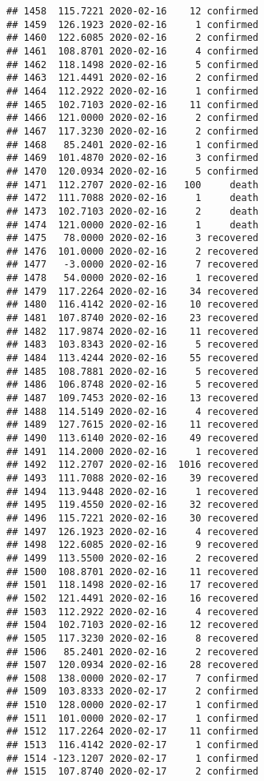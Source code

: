 \documentclass[
]{article}
\begin{document}
\begin{verbatim}
## 1458  115.7221 2020-02-16    12 confirmed
## 1459  126.1923 2020-02-16     1 confirmed
## 1460  122.6085 2020-02-16     2 confirmed
## 1461  108.8701 2020-02-16     4 confirmed
## 1462  118.1498 2020-02-16     5 confirmed
## 1463  121.4491 2020-02-16     2 confirmed
## 1464  112.2922 2020-02-16     1 confirmed
## 1465  102.7103 2020-02-16    11 confirmed
## 1466  121.0000 2020-02-16     2 confirmed
## 1467  117.3230 2020-02-16     2 confirmed
## 1468   85.2401 2020-02-16     1 confirmed
## 1469  101.4870 2020-02-16     3 confirmed
## 1470  120.0934 2020-02-16     5 confirmed
## 1471  112.2707 2020-02-16   100     death
## 1472  111.7088 2020-02-16     1     death
## 1473  102.7103 2020-02-16     2     death
## 1474  121.0000 2020-02-16     1     death
## 1475   78.0000 2020-02-16     3 recovered
## 1476  101.0000 2020-02-16     2 recovered
## 1477   -3.0000 2020-02-16     7 recovered
## 1478   54.0000 2020-02-16     1 recovered
## 1479  117.2264 2020-02-16    34 recovered
## 1480  116.4142 2020-02-16    10 recovered
## 1481  107.8740 2020-02-16    23 recovered
## 1482  117.9874 2020-02-16    11 recovered
## 1483  103.8343 2020-02-16     5 recovered
## 1484  113.4244 2020-02-16    55 recovered
## 1485  108.7881 2020-02-16     5 recovered
## 1486  106.8748 2020-02-16     5 recovered
## 1487  109.7453 2020-02-16    13 recovered
## 1488  114.5149 2020-02-16     4 recovered
## 1489  127.7615 2020-02-16    11 recovered
## 1490  113.6140 2020-02-16    49 recovered
## 1491  114.2000 2020-02-16     1 recovered
## 1492  112.2707 2020-02-16  1016 recovered
## 1493  111.7088 2020-02-16    39 recovered
## 1494  113.9448 2020-02-16     1 recovered
## 1495  119.4550 2020-02-16    32 recovered
## 1496  115.7221 2020-02-16    30 recovered
## 1497  126.1923 2020-02-16     4 recovered
## 1498  122.6085 2020-02-16     9 recovered
## 1499  113.5500 2020-02-16     2 recovered
## 1500  108.8701 2020-02-16    11 recovered
## 1501  118.1498 2020-02-16    17 recovered
## 1502  121.4491 2020-02-16    16 recovered
## 1503  112.2922 2020-02-16     4 recovered
## 1504  102.7103 2020-02-16    12 recovered
## 1505  117.3230 2020-02-16     8 recovered
## 1506   85.2401 2020-02-16     2 recovered
## 1507  120.0934 2020-02-16    28 recovered
## 1508  138.0000 2020-02-17     7 confirmed
## 1509  103.8333 2020-02-17     2 confirmed
## 1510  128.0000 2020-02-17     1 confirmed
## 1511  101.0000 2020-02-17     1 confirmed
## 1512  117.2264 2020-02-17    11 confirmed
## 1513  116.4142 2020-02-17     1 confirmed
## 1514 -123.1207 2020-02-17     1 confirmed
## 1515  107.8740 2020-02-17     2 confirmed

\end{verbatim}
\end{document}

